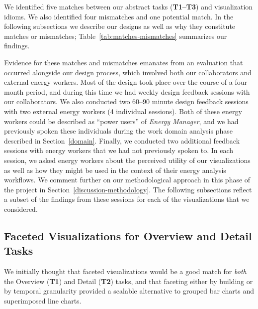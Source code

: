\documentclass[journal]{vgtc}                %
\begin{document}
We identified five matches between our abstract tasks ({\bf T1--T3}) and visualization idioms. 
We also identified four mismatches and one potential match. 
In the following subsections we describe our designs as well as why they constitute matches or mismatches; Table~\ref{tab:matches-mismatches} summarizes our findings.

Evidence for these matches and mismatches emanates from an evaluation that occurred alongside our design process, which involved both our collaborators and external energy workers.
Most of the design took place over the course of a four month period, and during this time we had weekly design feedback sessions with our collaborators.
We also conducted two 60--90 minute design feedback sessions with two external energy workers (4 individual sessions).
Both of these energy workers could be described as ``power users'' of {\it Energy Manager}, and we had previously spoken these individuals during the work domain analysis phase described in Section~\ref{domain}.
Finally, we conducted two additional feedback sessions with energy workers that we had not previously spoken to.
In each session, we asked energy workers about the perceived utility of our visualizations as well as how they might be used in the context of their energy analysis workflows.
We comment further on our methodological approach in this phase of the project in Section~\ref{discussion-methodology}. 
The following subsections reflect a subset of the findings from these sessions for each of the visualizations that we considered.


\subsection{Faceted Visualizations for Overview and Detail Tasks}
\label{design-faceting}



We initially thought that faceted visualizations would be a good match for {\it both} the Overview ({\bf T1}) and Detail ({\bf T2}) tasks, and that faceting either by building or by temporal granularity provided a scalable alternative to grouped bar charts and superimposed line charts.
\end{document}
